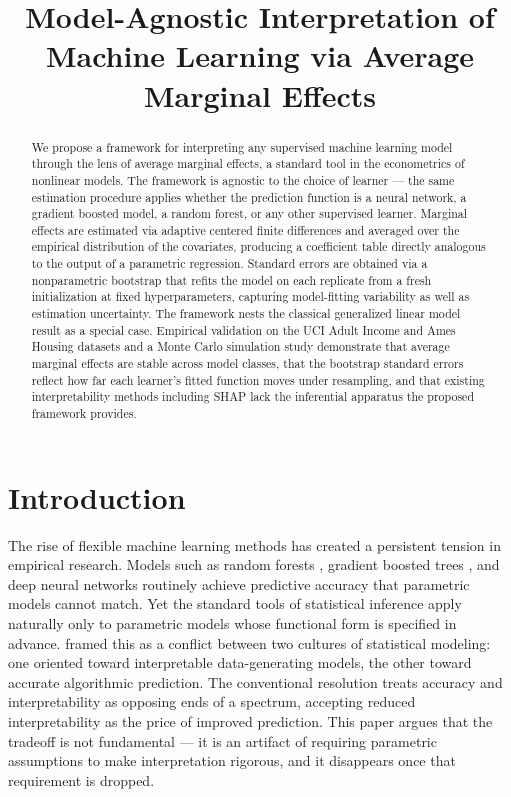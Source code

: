 \documentclass[conference]{IEEEtran}
\begin{document}
	
	\title{Model-Agnostic Interpretation of Machine Learning via Average Marginal Effects}
	\author{
	}
	\date{}
	
	\maketitle
	
	\begin{abstract}
		\noindent We propose a framework for interpreting any supervised machine learning model through the lens of average marginal effects, a standard tool in the econometrics of nonlinear models. The framework is agnostic to the choice of learner --- the same estimation procedure applies whether the prediction function is a neural network, a gradient boosted model, a random forest, or any other supervised learner. Marginal effects are estimated via adaptive centered finite differences and averaged over the empirical distribution of the covariates, producing a coefficient table directly analogous to the output of a parametric regression. Standard errors are obtained via a nonparametric bootstrap that refits the model on each replicate from a fresh initialization at fixed hyperparameters, capturing model-fitting variability as well as estimation uncertainty. The framework nests the classical generalized linear model result as a special case. Empirical validation on the UCI Adult Income and Ames Housing datasets and a Monte Carlo simulation study demonstrate that average marginal effects are stable across model classes, that the bootstrap standard errors reflect how far each learner's fitted function moves under resampling, and that existing interpretability methods including SHAP lack the inferential apparatus the proposed framework provides.
	\end{abstract}
	
	\section{Introduction}
	
	The rise of flexible machine learning methods has created a persistent tension in empirical research. Models such as random forests \cite{breiman2001rf}, gradient boosted trees \cite{chen2016xgboost}, and deep neural networks \cite{lecun2015deep} routinely achieve predictive accuracy that parametric models cannot match. Yet the standard tools of statistical inference apply naturally only to parametric models whose functional form is specified in advance. \cite{breiman2001cultures} framed this as a conflict between two cultures of statistical modeling: one oriented toward interpretable data-generating models, the other toward accurate algorithmic prediction. The conventional resolution treats accuracy and interpretability as opposing ends of a spectrum, accepting reduced interpretability as the price of improved prediction. This paper argues that the tradeoff is not fundamental --- it is an artifact of requiring parametric assumptions to make interpretation rigorous, and it disappears once that requirement is dropped.
	
\end{document}
